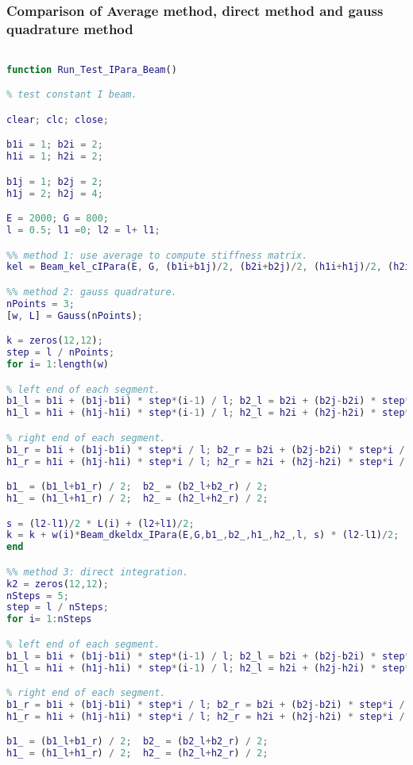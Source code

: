 \subsubsection{Comparison of Average method, direct method and gauss quadrature method}
\begin{lstlisting}[language = matlab]

function Run_Test_IPara_Beam()

% test constant I beam.

clear; clc; close;

b1i = 1; b2i = 2;
h1i = 1; h2i = 2;

b1j = 1; b2j = 2;
h1j = 2; h2j = 4;

E = 2000; G = 800;
l = 0.5; l1 =0; l2 = l+ l1;

%% method 1: use average to compute stiffness matrix.
kel = Beam_kel_cIPara(E, G, (b1i+b1j)/2, (b2i+b2j)/2, (h1i+h1j)/2, (h2i+h2j)/2, l);

%% method 2: gauss quadrature.
nPoints = 3;
[w, L] = Gauss(nPoints);

k = zeros(12,12);
step = l / nPoints;
for i= 1:length(w)

% left end of each segment.
b1_l = b1i + (b1j-b1i) * step*(i-1) / l; b2_l = b2i + (b2j-b2i) * step*(i-1) / l;
h1_l = h1i + (h1j-h1i) * step*(i-1) / l; h2_l = h2i + (h2j-h2i) * step*(i-1) / l;

% right end of each segment.
b1_r = b1i + (b1j-b1i) * step*i / l; b2_r = b2i + (b2j-b2i) * step*i / l;
h1_r = h1i + (h1j-h1i) * step*i / l; h2_r = h2i + (h2j-h2i) * step*i / l;

b1_ = (b1_l+b1_r) / 2;  b2_ = (b2_l+b2_r) / 2;
h1_ = (h1_l+h1_r) / 2;  h2_ = (h2_l+h2_r) / 2;

s = (l2-l1)/2 * L(i) + (l2+l1)/2;
k = k + w(i)*Beam_dkeldx_IPara(E,G,b1_,b2_,h1_,h2_,l, s) * (l2-l1)/2;
end

%% method 3: direct integration.
k2 = zeros(12,12);
nSteps = 5;
step = l / nSteps;
for i= 1:nSteps

% left end of each segment.
b1_l = b1i + (b1j-b1i) * step*(i-1) / l; b2_l = b2i + (b2j-b2i) * step*(i-1) / l;
h1_l = h1i + (h1j-h1i) * step*(i-1) / l; h2_l = h2i + (h2j-h2i) * step*(i-1) / l;

% right end of each segment.
b1_r = b1i + (b1j-b1i) * step*i / l; b2_r = b2i + (b2j-b2i) * step*i / l;
h1_r = h1i + (h1j-h1i) * step*i / l; h2_r = h2i + (h2j-h2i) * step*i / l;

b1_ = (b1_l+b1_r) / 2;  b2_ = (b2_l+b2_r) / 2;
h1_ = (h1_l+h1_r) / 2;  h2_ = (h2_l+h2_r) / 2;


\end{lstlisting}
